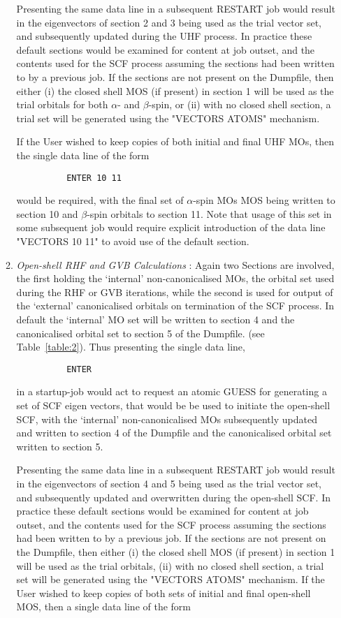 \documentclass[11pt,fleqn]{article}
\begin{document}
\begin{itemize}
\begin{enumerate}
Presenting the same data line in a subsequent RESTART job would result
in the eigenvectors of section 2 and 3  being used as the trial vector
set, and subsequently updated during the UHF process. In
practice these default sections would be examined for content at job
outset, and the contents used for the SCF process assuming the sections
had been written to by a previous job. If the sections are not present
on the Dumpfile, then either (i) the closed shell MOS (if present)
in section 1 will be used as the trial orbitals for both $\alpha$- and
$\beta$-spin, or (ii) with no closed shell section, a trial set will be
generated using the "VECTORS ATOMS" mechanism.

If the User wished to keep copies of both initial and final UHF MOs, then
the single data line of the form

{
\footnotesize
\begin{verbatim}
          ENTER 10 11
\end{verbatim}
}
would be required, with the final set of $\alpha$-spin MOs MOS being
written to section 10 and $\beta$-spin orbitals to section 11.
Note that usage of this set in some subsequent job would require
explicit introduction of the data line "VECTORS 10 11" to avoid use of
the default section.

\item {\em Open-shell RHF and GVB Calculations}  : Again two Sections are
involved, the first holding the `internal' non-canonicalised MOs, the
orbital set used during the RHF or GVB iterations, while the second is
used for output of the `external' canonicalised orbitals on termination
of the SCF process. In default the `internal' MO set will be written to
section 4 and the canonicalised orbital set to section 5 of the Dumpfile.
(see Table~\ref{table:2}). Thus presenting the single data line,

{
\footnotesize
\begin{verbatim}
          ENTER
\end{verbatim}
}
in a startup-job would act to request an atomic GUESS for generating
a set of SCF eigen vectors, that would be be used to initiate the open-shell
SCF, with the `internal' non-canonicalised MOs subsequently updated and
written to section 4 of the Dumpfile and the canonicalised orbital set
written to section 5.

Presenting the same data line in a subsequent RESTART job would result in
the eigenvectors of section 4 and 5  being used as the trial vector set,
and subsequently updated and overwritten during the open-shell SCF. In
practice these default sections would be examined for content at job
outset, and the contents used for the SCF process assuming the sections
had been written to by a previous job. If the sections are not present
on the Dumpfile, then either (i) the closed shell MOS (if present)
in section 1 will be used as the trial orbitals, (ii) with no closed
shell section, a trial set will be generated using the "VECTORS ATOMS"
mechanism.  If the User wished to keep copies of both sets of initial
and final open-shell MOS, then a single data line of the form


\end{enumerate}
\end{itemize}
\end{document}
